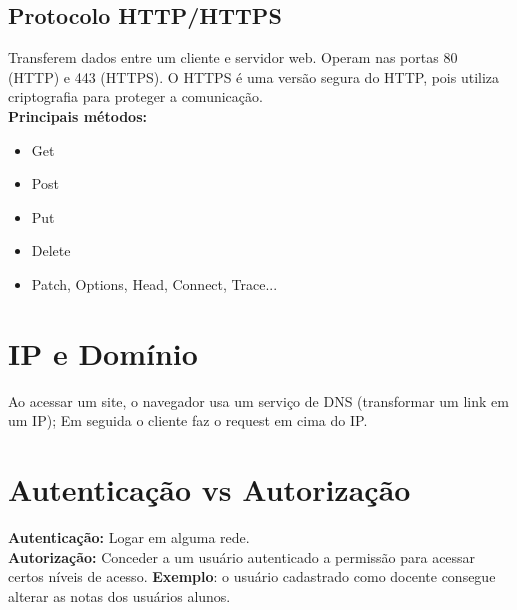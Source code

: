 \documentclass[ ]{article}
\begin{document}
		\subsection{Protocolo HTTP/HTTPS}
			Transferem dados entre um cliente e servidor web.  Operam nas portas 80 (HTTP) e 443 (HTTPS). O HTTPS é uma versão segura do HTTP, pois utiliza criptografia para proteger a comunicação.\\
			\textbf{Principais métodos:}
			\begin{itemize}
				\item Get
				\item Post
				\item Put
				\item Delete
				\item Patch, Options, Head, Connect, Trace...
			\end{itemize}
	\section{IP e Domínio}
		Ao acessar um site, o navegador usa um serviço de DNS (transformar um link em um IP); Em seguida o cliente faz o request em cima do IP.
	\section{Autenticação vs Autorização}
		\textbf{Autenticação:} Logar em alguma rede.\\
		\textbf{Autorização:} Conceder a um usuário autenticado a permissão para acessar certos níveis de acesso. \textbf{Exemplo}: o usuário cadastrado como docente consegue alterar as notas dos usuários alunos.
\end{document}
